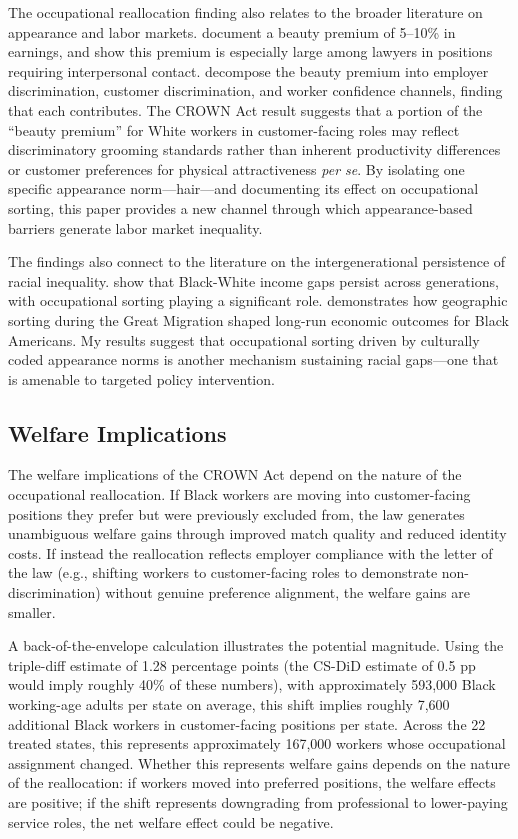 \documentclass[12pt]{article}
\begin{document}
The occupational reallocation finding also relates to the broader literature on appearance and labor markets. \citet{hamermesh1994} document a beauty premium of 5--10\% in earnings, and \citet{biddle1998} show this premium is especially large among lawyers in positions requiring interpersonal contact. \citet{mobius2006} decompose the beauty premium into employer discrimination, customer discrimination, and worker confidence channels, finding that each contributes. The CROWN Act result suggests that a portion of the ``beauty premium'' for White workers in customer-facing roles may reflect discriminatory grooming standards rather than inherent productivity differences or customer preferences for physical attractiveness \textit{per se}. By isolating one specific appearance norm---hair---and documenting its effect on occupational sorting, this paper provides a new channel through which appearance-based barriers generate labor market inequality.

The findings also connect to the literature on the intergenerational persistence of racial inequality. \citet{chetty2020} show that Black-White income gaps persist across generations, with occupational sorting playing a significant role. \citet{derenoncourt2021} demonstrates how geographic sorting during the Great Migration shaped long-run economic outcomes for Black Americans. My results suggest that occupational sorting driven by culturally coded appearance norms is another mechanism sustaining racial gaps---one that is amenable to targeted policy intervention.

\subsection{Welfare Implications}

The welfare implications of the CROWN Act depend on the nature of the occupational reallocation. If Black workers are moving into customer-facing positions they prefer but were previously excluded from, the law generates unambiguous welfare gains through improved match quality and reduced identity costs. If instead the reallocation reflects employer compliance with the letter of the law (e.g., shifting workers to customer-facing roles to demonstrate non-discrimination) without genuine preference alignment, the welfare gains are smaller.

A back-of-the-envelope calculation illustrates the potential magnitude. Using the triple-diff estimate of 1.28 percentage points (the CS-DiD estimate of 0.5 pp would imply roughly 40\% of these numbers), with approximately 593,000 Black working-age adults per state on average, this shift implies roughly 7,600 additional Black workers in customer-facing positions per state. Across the 22 treated states, this represents approximately 167,000 workers whose occupational assignment changed. Whether this represents welfare gains depends on the nature of the reallocation: if workers moved into preferred positions, the welfare effects are positive; if the shift represents downgrading from professional to lower-paying service roles, the net welfare effect could be negative.
\end{document}

